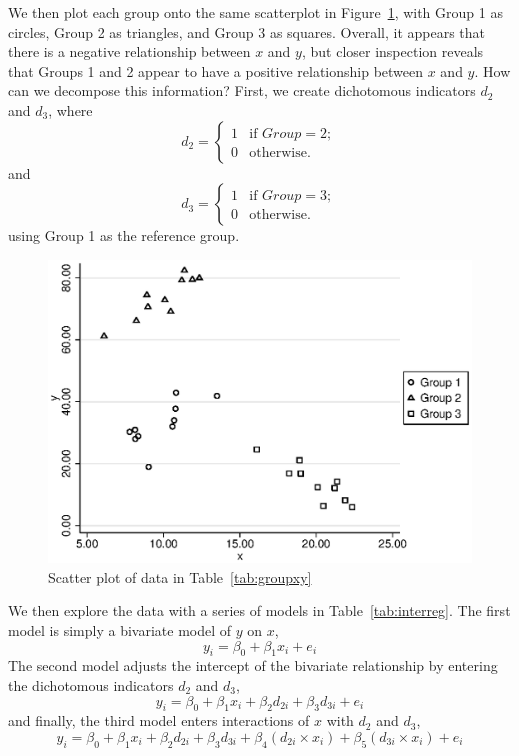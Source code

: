 We then plot each group onto the same scatterplot in Figure~\ref{fig:interscatter}, with Group 1 as circles, Group 2 as triangles, and Group 3 as squares. Overall, it appears that there is a negative relationship between $x$ and $y$, but closer inspection reveals that Groups 1 and 2 appear to have a positive relationship between $x$ and $y$. How can we decompose this information? First, we create dichotomous indicators $d_2$ and $d_3$, where
\[
d_2 = \left\{ \begin{array}{ll}
     1 & \mbox{if $Group = 2$};\\
     0 & \mbox{otherwise}.\end{array} \right.
\]
and
\[
d_3 = \left\{ \begin{array}{ll}
     1 & \mbox{if $Group = 3$};\\
     0 & \mbox{otherwise}.\end{array} \right.
\]
using Group 1 as the reference group.
\begin{figure}
   \centering
   \includegraphics[angle=0,
           width=.75\textwidth]{interscatter.eps}
   \caption{Scatter plot of data in Table~\ref{tab:groupxy}}
  \label{fig:interscatter}
\end{figure}
We then explore the data with a series of models in Table~\ref{tab:interreg}. The first model is simply a bivariate model of $y$ on $x$,
\[
y_i=\beta_0+\beta_1x_i+e_i
\]
The second model adjusts the intercept of the bivariate relationship by entering the dichotomous indicators $d_2$ and $d_3$,
\[
y_i=\beta_0+\beta_1x_i+\beta_2d_{2i}+\beta_3d_{3i}+e_i
\]
and finally, the third model enters interactions of $x$ with $d_2$ and $d_3$,
\[
y_i=\beta_0+\beta_1x_i+\beta_2d_{2i}+\beta_3d_{3i}+\beta_4\left(d_{2i}\times x_i\right)+\beta_5\left(d_{3i} \times x_i\right)+e_i
\]

